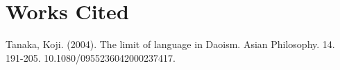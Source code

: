 \section*{\centering Works Cited}

Tanaka, Koji. (2004). The limit of language in Daoism. Asian Philosophy. 14. 191-205. 10.1080/0955236042000237417.




